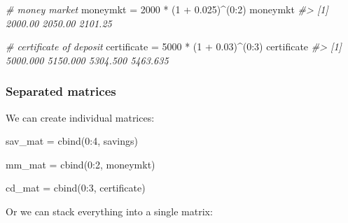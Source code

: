 \documentclass[
]{book}
\newenvironment{Shaded}{\begin{snugshade}}{\end{snugshade}}
\newcommand{\CommentTok}[1]{\textcolor[rgb]{0.56,0.35,0.01}{\textit{#1}}}
\newcommand{\DecValTok}[1]{\textcolor[rgb]{0.00,0.00,0.81}{#1}}
\newcommand{\FloatTok}[1]{\textcolor[rgb]{0.00,0.00,0.81}{#1}}
\newcommand{\FunctionTok}[1]{\textcolor[rgb]{0.00,0.00,0.00}{#1}}
\newcommand{\NormalTok}[1]{#1}
\newcommand{\OtherTok}[1]{\textcolor[rgb]{0.56,0.35,0.01}{#1}}
\newcommand{\SpecialCharTok}[1]{\textcolor[rgb]{0.00,0.00,0.00}{#1}}
\begin{document}
\begin{Shaded}
\begin{Highlighting}[]
\CommentTok{\# money market}
\NormalTok{moneymkt }\OtherTok{=} \DecValTok{2000} \SpecialCharTok{*}\NormalTok{ (}\DecValTok{1} \SpecialCharTok{+} \FloatTok{0.025}\NormalTok{)}\SpecialCharTok{\^{}}\NormalTok{(}\DecValTok{0}\SpecialCharTok{:}\DecValTok{2}\NormalTok{)}
\NormalTok{moneymkt}
\CommentTok{\#\textgreater{} [1] 2000.00 2050.00 2101.25}
\end{Highlighting}
\end{Shaded}

\begin{Shaded}
\begin{Highlighting}[]
\CommentTok{\# certificate of deposit}
\NormalTok{certificate }\OtherTok{=} \DecValTok{5000} \SpecialCharTok{*}\NormalTok{ (}\DecValTok{1} \SpecialCharTok{+} \FloatTok{0.03}\NormalTok{)}\SpecialCharTok{\^{}}\NormalTok{(}\DecValTok{0}\SpecialCharTok{:}\DecValTok{3}\NormalTok{)}
\NormalTok{certificate}
\CommentTok{\#\textgreater{} [1] 5000.000 5150.000 5304.500 5463.635}
\end{Highlighting}
\end{Shaded}

\hypertarget{separated-matrices}{%
\subsubsection*{Separated matrices}\label{separated-matrices}}

We can create individual matrices:

\begin{Shaded}
\begin{Highlighting}[]
\NormalTok{sav\_mat }\OtherTok{=} \FunctionTok{cbind}\NormalTok{(}\DecValTok{0}\SpecialCharTok{:}\DecValTok{4}\NormalTok{, savings)}

\NormalTok{mm\_mat }\OtherTok{=} \FunctionTok{cbind}\NormalTok{(}\DecValTok{0}\SpecialCharTok{:}\DecValTok{2}\NormalTok{, moneymkt)}

\NormalTok{cd\_mat }\OtherTok{=} \FunctionTok{cbind}\NormalTok{(}\DecValTok{0}\SpecialCharTok{:}\DecValTok{3}\NormalTok{, certificate)}
\end{Highlighting}
\end{Shaded}

Or we can stack everything into a single matrix:
\end{document}
